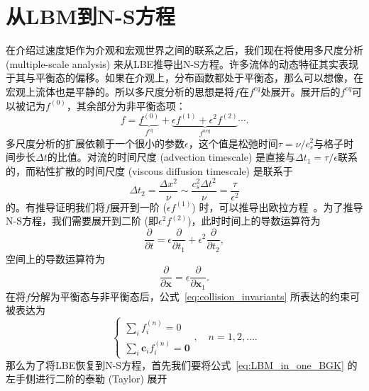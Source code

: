 \section{从LBM到N-S方程}
\label{sec:lbm_to_ns}
在介绍过速度矩作为介观和宏观世界之间的联系之后，我们现在将使用多尺度分析 (multiple-scale analysis) 来从LBE推导出N-S方程。许多流体的动态特征其实表现于其与平衡态的偏移。如果在介观上，分布函数都处于平衡态，那么可以想像，在宏观上流体也是平静的。所以多尺度分析的思想是将$f$在$f^{eq}$处展开。展开后的$f^{eq}$可以被记为$f^{(0)}$，其余部分为非平衡态项：
\begin{equation}
    f=\underbrace{f^{(0)}}_{f^{e q}}+\underbrace{\epsilon f^{(1)}+\epsilon^2 f^{(2)}}_{f^{n e q}} \cdots .
\end{equation}
多尺度分析的扩展依赖于一个很小的参数$\epsilon$，这个值是松弛时间$\tau=\nu/c_s^2$与格子时间步长$\Delta t$的比值。对流的时间尺度 (advection timescale) 是直接与$\Delta t_1=\tau/\epsilon$联系的，而粘性扩散的时间尺度 (viscous diffusion timescale) 是联系于
\begin{equation}
    \Delta t_2=\frac{\Delta x^2}{\nu} \sim \frac{c_s^2 \Delta t^2}{\nu}=\frac{\tau}{\epsilon^2}
    \label{eq:ms_f}
\end{equation}
的。有推导证明我们将$f$展开到一阶 ($\epsilon f^{(1)}$) 时，可以推导出欧拉方程~\citep{huang2008statistical}。为了推导N-S方程，我们需要展开到二阶 (即$\epsilon^2 f^{(2)}$)，此时时间上的导数运算符为
\begin{equation}
    \frac{\partial}{\partial t}=\epsilon \frac{\partial}{\partial t_1}+\epsilon^2 \frac{\partial}{\partial t_2},
    \label{eq:ms_t}
\end{equation}
空间上的导数运算符为
\begin{equation}
    \frac{\partial}{\partial \boldsymbol{x}}=\epsilon \frac{\partial}{\partial \boldsymbol{x}_1}.
    \label{eq:ms_x}
\end{equation}
在将$f$分解为平衡态与非平衡态后，公式~\ref{eq:collision_invariants} 所表达的约束可被表达为
\begin{equation}
    \left\{\begin{array}{l}\sum_{i} f_{i}^{(n)}=0 \\ \sum_{i} \mathbf{c}_{i} f_{i}^{(n)}=\mathbf{0}\end{array}\right., \quad  n=1,2, \ldots.
\end{equation}
那么为了将LBE恢复到N-S方程，首先我们要将公式~\ref{eq:LBM_in_one_BGK} 的左手侧进行二阶的泰勒 (Taylor) 展开
